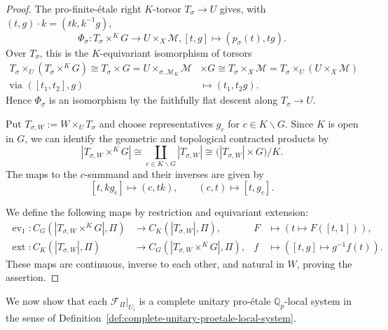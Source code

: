 \documentclass[11pt]{article}
\theoremstyle{definition}
\newcommand{\Qp}{\mathbb Q_p}
\newcommand{\cM}{\mathcal M}
\newcommand{\cF}{\mathcal F}
\begin{document}
\begin{proof}
The pro-finite-\'etale right \(K\)-torsor \(T_\sigma\to U\) gives, with
$(t,g)\cdot k=(tk,k^{-1}g)$,
\[
 \Phi_\sigma:T_\sigma\times^K G
 \rightarrow U\times_X\cM,
 [t,g]\longmapsto(p_\sigma(t),tg).
\]
Over $T_\sigma$, this is the $K$-equivariant isomorphism of torsors
\[\begin{aligned}
T_\sigma\times_{U}(T_\sigma\times^KG)\cong T_\sigma\times G= U\times_{\sigma, \cM_K}\cM&\times G\cong T_\sigma\times_X\cM=T_\sigma\times_{U}(U\times_X\cM)\\
\text{via }([t_1, t_2], g)&\mapsto(t_1, t_2g).
\end{aligned}\]
Hence $\Phi_\sigma$ is an isomorphism by the faithfully flat descent along $T_\sigma\to U$.

Put $T_{\sigma,W}:=W\times_U T_\sigma$ and choose representatives
$g_c$ for $c\in K\backslash G$.  Since $K$ is open in $G$, we can identify
the geometric and topological contracted products by
\[
 |T_{\sigma,W}\times^K G|
 \cong\coprod_{c\in K\backslash G}|T_{\sigma,W}|
 \cong\bigl(|T_{\sigma,W}|\times G\bigr)/K.
\]
The maps to the $c$-summand and their inverses are given by
\[
 [t,kg_c]\longmapsto(c,tk),\qquad
 (c,t)\longmapsto[t,g_c].
\]

We define the following maps by restriction and equivariant extension:
\begin{align*}
 \operatorname{ev}_1:C_G(|T_{\sigma,W}\times^K G|,\Pi)
 &\longrightarrow C_K(|T_{\sigma,W}|,\Pi),
 &F&\longmapsto(t\mapsto F([t,1])),\\
 \operatorname{ext}:C_K(|T_{\sigma,W}|,\Pi)
 &\longrightarrow C_G(|T_{\sigma,W}\times^K G|,\Pi),
 &f&\longmapsto([t,g]\mapsto g^{-1}f(t)).
\end{align*}
These maps are continuous, inverse to each other, and natural in $W$, proving the assertion.
\end{proof}

We now show that each \(\cF_\Pi|_{U_i}\) is a complete unitary
pro-\'etale \(\Qp\)-local system in the sense of
Definition~\ref{def:complete-unitary-proetale-local-system}.
\end{document}
